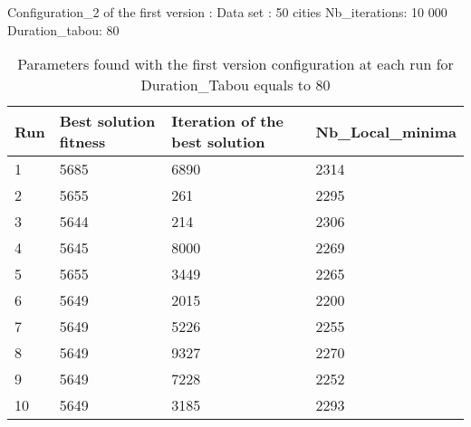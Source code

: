 \documentclass[12pt,oneside,a4paper]{article}
\begin{document}
  \newpage
Configuration\_2 of the first version : 
\newline
Data set : 50 cities 
\newline
Nb\_iterations: 10 000 
\newline
Duration\_tabou: 80
\begin{table}[h]
    \centering
    \small
    \begin{tabular}{llll}
      \hline
      \multicolumn{1}{|l|}{\textbf{Run}}& \multicolumn{1}{l|}{\textbf{Best solution fitness}}& \multicolumn{1}{l|}{\textbf{Iteration of the best solution}}& \multicolumn{1}{l|}{\textbf{Nb\_Local\_minima}}\\ \hline
      \multicolumn{1}{|l|}{1} & \multicolumn{1}{l|}{5685}  & \multicolumn{1}{l|}{6890} & \multicolumn{1}{l|}{2314}  \\ \hline
      \multicolumn{1}{|l|}{2} & \multicolumn{1}{l|}{5655}  & \multicolumn{1}{l|}{261} & \multicolumn{1}{l|}{2295}  \\ \hline         
      \multicolumn{1}{|l|}{3} & \multicolumn{1}{l|}{5644}  & \multicolumn{1}{l|}{214}  & \multicolumn{1}{l|}{2306}  \\ \hline
      \multicolumn{1}{|l|}{4} & \multicolumn{1}{l|}{5645}  & \multicolumn{1}{l|}{8000}  & \multicolumn{1}{l|}{2269}  \\ \hline
      \multicolumn{1}{|l|}{5} & \multicolumn{1}{l|}{5655}  & \multicolumn{1}{l|}{3449}  & \multicolumn{1}{l|}{2265}  \\ \hline
      \multicolumn{1}{|l|}{6} & \multicolumn{1}{l|}{5649}  & \multicolumn{1}{l|}{2015}  & \multicolumn{1}{l|}{2200}  \\ \hline
      \multicolumn{1}{|l|}{7} & \multicolumn{1}{l|}{5649}  & \multicolumn{1}{l|}{5226}  & \multicolumn{1}{l|}{2255}  \\ \hline
      \multicolumn{1}{|l|}{8} & \multicolumn{1}{l|}{5649}  & \multicolumn{1}{l|}{9327} & \multicolumn{1}{l|}{2270}  \\ \hline
      \multicolumn{1}{|l|}{9} & \multicolumn{1}{l|}{5649}  & \multicolumn{1}{l|}{7228} & \multicolumn{1}{l|}{2252}  \\ \hline
      \multicolumn{1}{|l|}{10} & \multicolumn{1}{l|}{5649}  & \multicolumn{1}{l|}{3185} & \multicolumn{1}{l|}{2293}  \\ \hline
    \end{tabular}
    \caption{Parameters found with the first version configuration at each run for  Duration\_Tabou equals to 80}
  \end{table}
\end{document}

